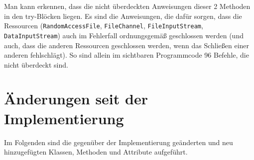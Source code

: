 \documentclass[a4paper, 11pt]{article}
\newcommand{\code}[1]{\texttt{#1}}
\begin{document}
Man kann erkennen, dass die nicht überdeckten Anweisungen dieser 2 Methoden in den try-Blöcken liegen.
Es sind die Anweisungen, die dafür sorgen, dass die Ressourcen 
(\code{RandomAccessFile}, \code{FileChannel}, \code{FileInputStream}, \code{DataInputStream}) 
auch im Fehlerfall ordnungsgemäß geschlossen werden
(und auch, dass die anderen Ressourcen geschlossen werden,
wenn das Schließen einer anderen fehlschlägt).
So sind allein im sichtbaren Programmcode 96 Befehle, die nicht überdeckt sind.

\section{Änderungen seit der Implementierung}
Im Folgenden sind die gegenüber der Implementierung geänderten und neu hinzugefügten Klassen, Methoden und Attribute aufgeführt.
\end{document}
